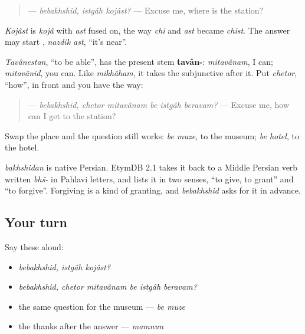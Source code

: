 \begin{quote}
\textbf{  } — \emph{bebakhshid, istgâh kojâst?} — Excuse me, where is the station?
\end{quote}

\emph{Kojâst} is \emph{kojâ} with \emph{ast} fused on, the way \emph{chi} and \emph{ast} became \emph{chist}. The answer may start \textbf{ }, \emph{nazdik ast}, \textquotedblleft{}it's near\textquotedblright{}.

\begin{grammarlens}[title={Grammar Lens: chetor mitavânam be ... beravam?}]
\emph{Tavânestan}, \textquotedblleft{}to be able\textquotedblright{}, has the present stem \textbf{tavân-}: \emph{mitavânam}, I can; \emph{mitavânid}, you can. Like \emph{mikhâham}, it takes the subjunctive after it. Put \emph{chetor}, \textquotedblleft{}how\textquotedblright{}, in front and you have the way:

\begin{quote}
\textbf{     } — \emph{bebakhshid, chetor mitavânam be istgâh beravam?} — Excuse me, how can I get to the station?
\end{quote}

Swap the place and the question still works: \emph{be muze}, to the museum; \emph{be hotel}, to the hotel.
\end{grammarlens}

\begin{cousinweb}
\emph{bakhshidan} is native Persian. EtymDB 2.1 takes it back to a Middle Persian verb written \emph{bhš-} in Pahlavi letters, and lists it in two senses, \textquotedblleft{}to give, to grant\textquotedblright{} and \textquotedblleft{}to forgive\textquotedblright{}. Forgiving is a kind of granting, and \emph{bebakhshid} asks for it in advance.
\end{cousinweb}

\subsection*{Your turn}
Say these aloud:

\begin{itemize}
\raggedright
  \item \emph{bebakhshid, istgâh kojâst?}
  \item \emph{bebakhshid, chetor mitavânam be istgâh beravam?}
  \item the same question for the museum — \emph{be muze}
  \item the thanks after the answer — \emph{mamnun}
\end{itemize}

